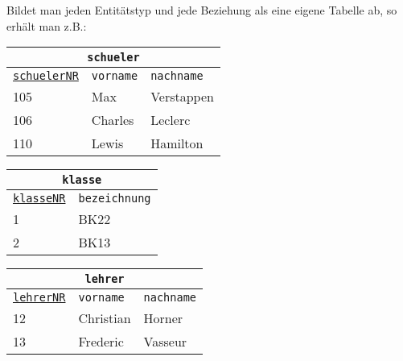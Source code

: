 Bildet man jeden Entitätstyp und jede Beziehung als eine eigene Tabelle ab, so erhält man z.B.:
\begin{minipage}{\textwidth}
	\begin{minipage}{0.5\textwidth}
		\begin{tabular}{lll}
			\multicolumn{3}{c}{\lstinline!schueler!}\\
			\hline
			\underline{\lstinline!schuelerNR!}&\lstinline!vorname!&\lstinline!nachname!\\
			\hline
			105&Max&Verstappen\\
			106&Charles&Leclerc\\
			110&Lewis&Hamilton\\
		\end{tabular}
	\end{minipage}%
	\begin{minipage}{0.5\textwidth}
		\begin{tabular}{ll}
			\multicolumn{2}{c}{\lstinline!klasse!}\\
			\hline
			\underline{\lstinline!klasseNR!}&\lstinline!bezeichnung!\\
			\hline
			1&BK22\\
			2&BK13\\
		\end{tabular}
	\end{minipage}%
\end{minipage}
\begin{minipage}{0.3\textwidth}
	\begin{tabular}{lll}
		\multicolumn{3}{c}{\lstinline!lehrer!}\\
		\hline
		\underline{\lstinline!lehrerNR!}&\lstinline!vorname!&\lstinline!nachname!\\
		\hline
		12&Christian&Horner\\
		13&Frederic&Vasseur\\
	\end{tabular}
\end{minipage}
